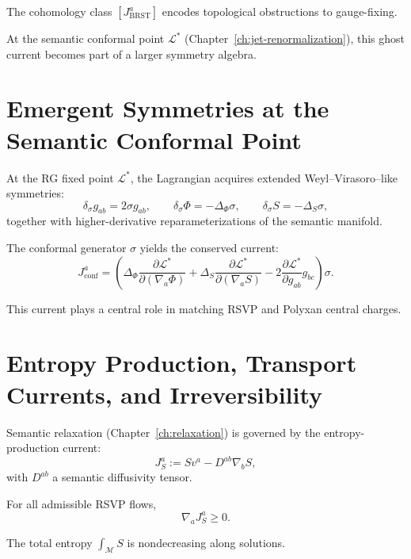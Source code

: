 The cohomology class $[J^a_{\mathrm{BRST}}]$ encodes topological
obstructions to gauge-fixing.

At the semantic conformal point $\mathcal{L}^*$ (Chapter~\ref{ch:jet-renormalization}),
this ghost current becomes part of a larger symmetry algebra.

\section{Emergent Symmetries at the Semantic Conformal Point}

At the RG fixed point $\mathcal{L}^*$, the Lagrangian acquires extended
Weyl–Virasoro–like symmetries:
\[
\delta_\sigma g_{ab} = 2\sigma g_{ab}, \qquad
\delta_\sigma \Phi = -\Delta_\Phi \sigma, \qquad
\delta_\sigma S = -\Delta_S \sigma,
\]
together with higher-derivative reparameterizations of the semantic manifold.

\begin{proposition}
The conformal generator $\sigma$ yields the conserved current:
\[
J^a_{\mathrm{conf}}
  = \left(
      \Delta_\Phi \frac{\partial \mathcal{L}^*}{\partial (\nabla_a \Phi)}
    + \Delta_S   \frac{\partial \mathcal{L}^*}{\partial (\nabla_a S)}
    - 2 \frac{\partial \mathcal{L}^*}{\partial g_{ab}} g_{bc}
    \right) \sigma.
\]
\end{proposition}

This current plays a central role in matching RSVP and Polyxan central charges.

\section{Entropy Production, Transport Currents, and Irreversibility}

Semantic relaxation (Chapter~\ref{ch:relaxation}) is governed by the
entropy-production current:
\[
J^a_S := S v^a - D^{ab} \nabla_b S,
\]
with $D^{ab}$ a semantic diffusivity tensor.

\begin{theorem}
For all admissible RSVP flows,
\[
\nabla_a J^a_S \ge 0.
\]
\end{theorem}

\begin{corollary}
The total entropy $\int_\mathcal{M} S$ is nondecreasing along solutions.
\end{corollary}

